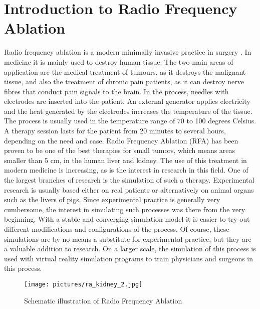 \documentclass[parskip=half, titlepage=yes, 12pt, BCOR=12mm, DIV=calc]{scrartcl}
\begin{document}
\maketitle
\tableofcontents

\clearpage




\section{Introduction to Radio Frequency Ablation}
Radio frequency ablation is a modern minimally invasive practice in surgery . In medicine it is mainly used to destroy human tissue. The two main areas of application are the medical treatment of tumours, as it destroys the malignant tissue, and also the treatment of chronic pain patients, as it can destroy nerve fibres that conduct pain signals to the brain. In the process, needles with electrodes are inserted into the patient. An external generator applies electricity and the heat generated by the electrodes increases the temperature of the tissue. The process is usually used in the temperature range of 70 to 100 degrees Celsius. A therapy session lasts for the patient from 20 minutes to several hours, depending on the need and case.
Radio Frequency Ablation (RFA) has been proven to be one of the best therapies for small tumors, which means areas smaller than 5 cm, in the human liver and kidney. The use of this treatment in modern medicine is increasing, as is the interest in research in this field. 
One of the largest branches of research is the simulation of such a therapy. Experimental research is usually based either on real patients or alternatively on animal organs such as the livers of pigs. Since experimental practice is generally very cumbersome, the interest in simulating such processes was there from the very beginning.  
With a stable and converging simulation model it is easier to try out different modifications and configurations of the process. Of course, these simulations are by no means a substitute for experimental practice, but they are a valuable addition to research. 
On a larger scale, the simulation of this process is used with virtual reality simulation programs to train physicians and surgeons in this process.\\

\begin{figure}[H]
    \centering
    \texttt{[image: pictures/ra\_kidney\_2.jpg]}
    \caption{Schematic illustration of Radio Frequency Ablation}
    \label{fig:ra_kidney_2}
\end{figure}
\end{document}
